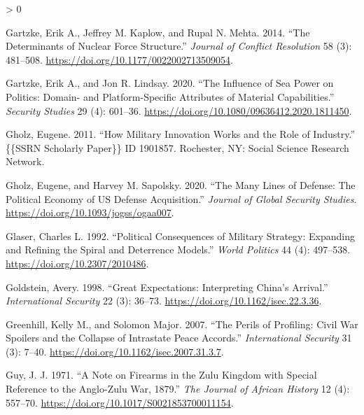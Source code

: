 \documentclass[
]{article}
\newlength{\cslhangindent}
\newenvironment{CSLReferences}[2] %
 {%
  \setlength{\parindent}{0pt}
  \ifodd #1 \everypar{\setlength{\hangindent}{\cslhangindent}}\ignorespaces\fi
  \ifnum #2 > 0
  \setlength{\parskip}{#2\baselineskip}
  \fi
 }%
 {}
\begin{document}
\begin{CSLReferences}{1}{0}
\leavevmode\hypertarget{ref-gartzke_determinantsnuclearforce_2014}{}%
Gartzke, Erik A., Jeffrey M. Kaplow, and Rupal N. Mehta. 2014. {``The {Determinants} of {Nuclear Force Structure}.''} \emph{Journal of Conflict Resolution} 58 (3): 481--508. \url{https://doi.org/10.1177/0022002713509054}.

\leavevmode\hypertarget{ref-gartzke_influenceseapower_2020}{}%
Gartzke, Erik A., and Jon R. Lindsay. 2020. {``The {Influence} of {Sea Power} on {Politics}: {Domain-} and {Platform-Specific Attributes} of {Material Capabilities}.''} \emph{Security Studies} 29 (4): 601--36. \url{https://doi.org/10.1080/09636412.2020.1811450}.

\leavevmode\hypertarget{ref-gholz_howmilitaryinnovation_2011}{}%
Gholz, Eugene. 2011. {``How {Military Innovation Works} and the {Role} of {Industry}.''} \{\{SSRN Scholarly Paper\}\} ID 1901857. {Rochester, NY}: {Social Science Research Network}.

\leavevmode\hypertarget{ref-gholz_manylinesdefense_2020}{}%
Gholz, Eugene, and Harvey M. Sapolsky. 2020. {``The {Many Lines} of {Defense}: {The Political Economy} of {US Defense Acquisition}.''} \emph{Journal of Global Security Studies}. \url{https://doi.org/10.1093/jogss/ogaa007}.

\leavevmode\hypertarget{ref-glaser_politicalconsequencesmilitary_1992}{}%
Glaser, Charles L. 1992. {``Political {Consequences} of {Military Strategy}: {Expanding} and {Refining} the {Spiral} and {Deterrence Models}.''} \emph{World Politics} 44 (4): 497--538. \url{https://doi.org/10.2307/2010486}.

\leavevmode\hypertarget{ref-goldstein_greatexpectationsinterpreting_1998}{}%
Goldstein, Avery. 1998. {``Great {Expectations}: {Interpreting China}'s {Arrival}.''} \emph{International Security} 22 (3): 36--73. \url{https://doi.org/10.1162/isec.22.3.36}.

\leavevmode\hypertarget{ref-greenhill_perilsprofilingcivil_2007}{}%
Greenhill, Kelly M., and Solomon Major. 2007. {``The {Perils} of {Profiling}: {Civil War Spoilers} and the {Collapse} of {Intrastate Peace Accords}.''} \emph{International Security} 31 (3): 7--40. \url{https://doi.org/10.1162/isec.2007.31.3.7}.

\leavevmode\hypertarget{ref-guy_notefirearmszulu_1971}{}%
Guy, J. J. 1971. {``A {Note} on {Firearms} in the {Zulu Kingdom} with Special Reference to the {Anglo-Zulu War}, 1879.''} \emph{The Journal of African History} 12 (4): 557--70. \url{https://doi.org/10.1017/S0021853700011154}.


\end{CSLReferences}
\end{document}
